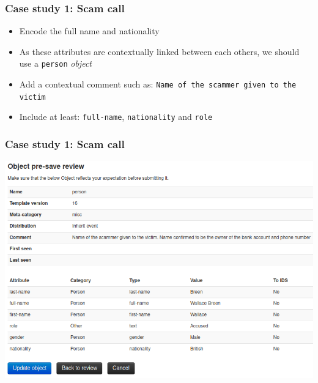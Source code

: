 \begin{frame}
    \frametitle{Case study 1: Scam call}
    \begin{itemize}
        \item Encode the full name and nationality
        \item As these attributes are contextually linked between each others, we should use a \texttt{person} \textit{object}
        \item Add a contextual comment such as: \texttt{Name of the scammer given to the victim}
        \item Include at least: \texttt{full-name}, \texttt{nationality} and \texttt{role}
    \end{itemize}
\end{frame}

\begin{frame}
    \frametitle{Case study 1: Scam call}
    \begin{center}
        \includegraphics[width=1.0\linewidth]{pictures/case1/object-person.png}
    \end{center}
\end{frame}

